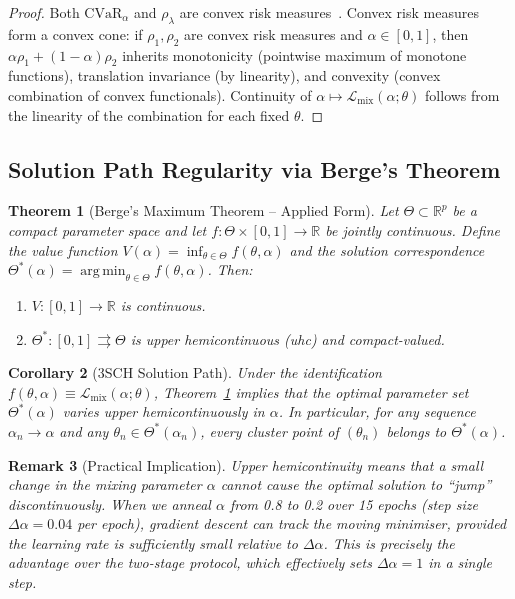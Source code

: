 \documentclass[11pt]{article}
\newtheorem{theorem}{Theorem}[section]
\newtheorem{corollary}[theorem]{Corollary}
\newtheorem{remark}[theorem]{Remark}
\newcommand{\R}{\mathbb{R}}
\newcommand{\cvar}{\mathrm{CVaR}}
\DeclareMathOperator*{\argmin}{arg\,min}
\begin{document}
\begin{proof}
Both $\cvar_\alpha$ and $\rho_\lambda$ are convex risk measures~\citep{artzner1999coherent, follmer2002convex}.  Convex risk measures form a convex cone: if $\rho_1,\rho_2$ are convex risk measures and $\alpha\in[0,1]$, then $\alpha\rho_1 + (1-\alpha)\rho_2$ inherits monotonicity (pointwise maximum of monotone functions), translation invariance (by linearity), and convexity (convex combination of convex functionals).  Continuity of $\alpha\mapsto\mathcal{L}_{\mathrm{mix}}(\alpha;\theta)$ follows from the linearity of the combination for each fixed $\theta$.
\end{proof}

\subsection{Solution Path Regularity via Berge's Theorem}

\begin{theorem}[Berge's Maximum Theorem -- Applied Form]
\label{thm:berge}
Let $\Theta \subset \R^p$ be a compact parameter space and let $f:\Theta\times[0,1]\to\R$ be jointly continuous.  Define the value function $V(\alpha) = \inf_{\theta\in\Theta} f(\theta,\alpha)$ and the solution correspondence $\Theta^*(\alpha) = \argmin_{\theta\in\Theta} f(\theta,\alpha)$.  Then:
\begin{enumerate}[noitemsep,label=(\roman*)]
    \item $V:[0,1]\to\R$ is continuous.
    \item $\Theta^*:[0,1]\rightrightarrows\Theta$ is upper hemicontinuous (uhc) and compact-valued.
\end{enumerate}
\end{theorem}

\begin{corollary}[3SCH Solution Path]
\label{cor:solution_path}
Under the identification $f(\theta,\alpha) \equiv \mathcal{L}_{\mathrm{mix}}(\alpha;\theta)$, Theorem~\ref{thm:berge} implies that the optimal parameter set $\Theta^*(\alpha)$ varies upper hemicontinuously in $\alpha$.  In particular, for any sequence $\alpha_n\to\alpha$ and any $\theta_n\in\Theta^*(\alpha_n)$, every cluster point of $(\theta_n)$ belongs to $\Theta^*(\alpha)$.
\end{corollary}

\begin{remark}[Practical Implication]
Upper hemicontinuity means that a small change in the mixing parameter $\alpha$ cannot cause the optimal solution to ``jump'' discontinuously.  When we anneal $\alpha$ from 0.8 to 0.2 over 15 epochs (step size $\Delta\alpha = 0.04$ per epoch), gradient descent can track the moving minimiser, provided the learning rate is sufficiently small relative to $\Delta\alpha$.  This is precisely the advantage over the two-stage protocol, which effectively sets $\Delta\alpha = 1$ in a single step.
\end{remark}
\end{document}
